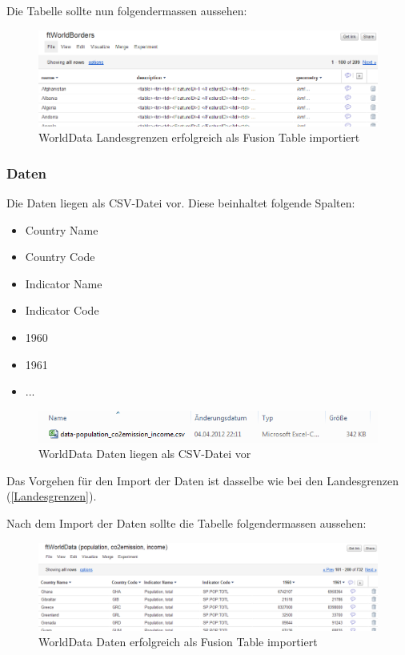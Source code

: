 Die Tabelle sollte nun folgendermassen aussehen:

\begin{figure}[!h]
	\centering
	\includegraphics[scale=0.65]{images/usecase1-worlddata/documentation/worlddata-worldborders_import_done.png}
	\caption{WorldData Landesgrenzen erfolgreich als Fusion Table importiert}
	\label{worlddata-worldborders_import_done}
\end{figure}

\subsubsection{Daten}
Die Daten liegen als CSV-Datei vor. Diese beinhaltet folgende Spalten:
\begin{itemize}
\item Country Name
\item Country Code
\item Indicator Name
\item Indicator Code
\item 1960
\item 1961
\item ...
\end{itemize}

\begin{figure}[!h]
	\centering
	\includegraphics{images/usecase1-worlddata/documentation/worlddata-data_csv.png}
	\caption{WorldData Daten liegen als CSV-Datei vor}
	\label{worlddata-data_csv}
\end{figure}

Das Vorgehen für den Import der Daten ist dasselbe wie bei den Landesgrenzen (\ref{Landesgrenzen}).

Nach dem Import der Daten sollte die Tabelle folgendermassen aussehen:

\begin{figure}[!h]
	\centering
	\includegraphics[scale=0.5]{images/usecase1-worlddata/documentation/worlddata-data_import_done.png}
	\caption{WorldData Daten erfolgreich als Fusion Table importiert}
	\label{worlddata-data_import_done}
\end{figure}


